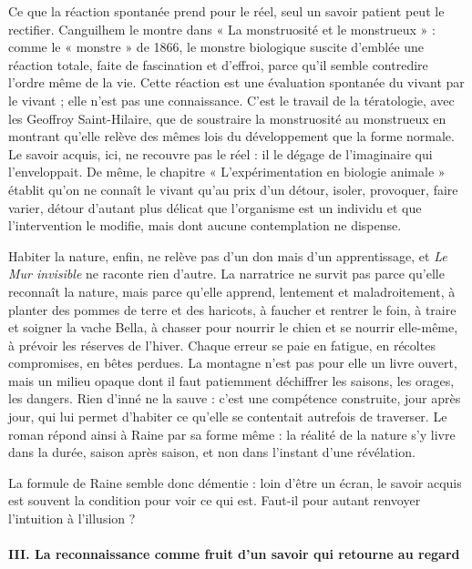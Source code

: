 \documentclass[11pt,a4paper]{article}
\begin{document}
Ce que la réaction spontanée prend pour le réel, seul un savoir patient peut le rectifier. Canguilhem le montre dans « La monstruosité et le monstrueux » : comme le « monstre » de 1866, le monstre biologique suscite d'emblée une réaction totale, faite de fascination et d'effroi, parce qu'il semble contredire l'ordre même de la vie. Cette réaction est une évaluation spontanée du vivant par le vivant ; elle n'est pas une connaissance. C'est le travail de la tératologie, avec les Geoffroy Saint-Hilaire, que de soustraire la monstruosité au monstrueux en montrant qu'elle relève des mêmes lois du développement que la forme normale. Le savoir acquis, ici, ne recouvre pas le réel : il le dégage de l'imaginaire qui l'enveloppait. De même, le chapitre « L'expérimentation en biologie animale » établit qu'on ne connaît le vivant qu'au prix d'un détour, isoler, provoquer, faire varier, détour d'autant plus délicat que l'organisme est un individu et que l'intervention le modifie, mais dont aucune contemplation ne dispense.

Habiter la nature, enfin, ne relève pas d'un don mais d'un apprentissage, et \emph{Le Mur invisible} ne raconte rien d'autre. La narratrice ne survit pas parce qu'elle reconnaît la nature, mais parce qu'elle apprend, lentement et maladroitement, à planter des pommes de terre et des haricots, à faucher et rentrer le foin, à traire et soigner la vache Bella, à chasser pour nourrir le chien et se nourrir elle-même, à prévoir les réserves de l'hiver. Chaque erreur se paie en fatigue, en récoltes compromises, en bêtes perdues. La montagne n'est pas pour elle un livre ouvert, mais un milieu opaque dont il faut patiemment déchiffrer les saisons, les orages, les dangers. Rien d'inné ne la sauve : c'est une compétence construite, jour après jour, qui lui permet d'habiter ce qu'elle se contentait autrefois de traverser. Le roman répond ainsi à Raine par sa forme même : la réalité de la nature s'y livre dans la durée, saison après saison, et non dans l'instant d'une révélation.

La formule de Raine semble donc démentie : loin d'être un écran, le savoir acquis est souvent la condition pour voir ce qui est. Faut-il pour autant renvoyer l'intuition à l'illusion ?

\hypertarget{iii.-la-reconnaissance-comme-fruit-dun-savoir-qui-retourne-au-regard}{%
\paragraph{III. La reconnaissance comme fruit d'un savoir qui retourne au regard}\label{iii.-la-reconnaissance-comme-fruit-dun-savoir-qui-retourne-au-regard}}
\end{document}
